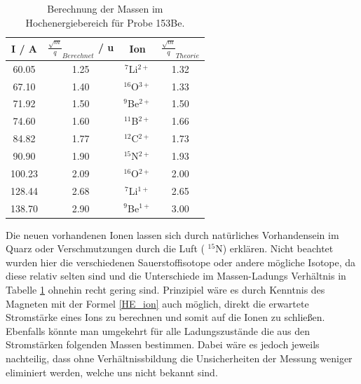 \begin{table}[H]
    \centering
    \caption{Berechnung der Massen im Hochenergiebereich für Probe 153Be.}
    \begin{tabular}{|c |c| c|c|}
        \hline
        I / \si{A} & $\frac{\sqrt{m}}{q}_{Berechnet}$ / \si{\atomicmassunit} & Ion & $\frac{\sqrt{m}}{q}_{Theorie}$ \\
        \hline
        \num{60.05}   & \num{1.25} &  $^{7}$Li$^{2+}$ & \num{1.32} \\
        \num{67.10}   & \num{1.40} &  $^{16}$O$^{3+}$ & \num{1.33} \\
        \num{71.92}  & \num{1.50}  &  $^{9}$Be$^{2+}$ & \num{1.50}\\
        \num{74.60}  & \num{1.60}  &  $^{11}$B$^{2+}$ & \num{1.66}\\
        \num{84.82}  & \num{1.77}  &  $^{12}$C$^{2+}$ & \num{1.73}\\
        \num{90.90}  & \num{1.90}  &  $^{15}$N$^{2+}$ & \num{1.93}\\
        \num{100.23} & \num{2.09} &  $^{16}$O$^{2+}$  & \num{2.00}\\
        \num{128.44} & \num{2.68} &  $^{7}$Li$^{1+}$  & \num{2.65}\\
        \num{138.70} & \num{2.90} &  $^{9}$Be$^{1+}$  & \num{3.00}\\
        \hline
    \end{tabular}
    \label{highenergy}
\end{table}

Die neuen vorhandenen Ionen lassen sich durch natürliches Vorhandensein im Quarz oder Verschmutzungen durch die Luft ( $^{15}$N) erklären.
Nicht beachtet wurden hier die verschiedenen Sauerstoffisotope oder andere mögliche Isotope, da diese relativ selten sind und die Unterschiede im Massen-Ladungs Verhältnis in Tabelle \ref{highenergy} ohnehin recht gering sind.
Prinzipiel wäre es durch Kenntnis des Magneten mit der Formel \ref{HE_ion} auch möglich, direkt die erwartete Stromstärke eines Ions zu berechnen und somit auf die Ionen zu schließen. Ebenfalls könnte man umgekehrt für alle Ladungszustände die aus den Stromstärken folgenden Massen bestimmen.
Dabei wäre es jedoch jeweils nachteilig, dass ohne Verhältnissbildung die Unsicherheiten der Messung weniger eliminiert werden, welche uns nicht bekannt sind.

\clearpage

